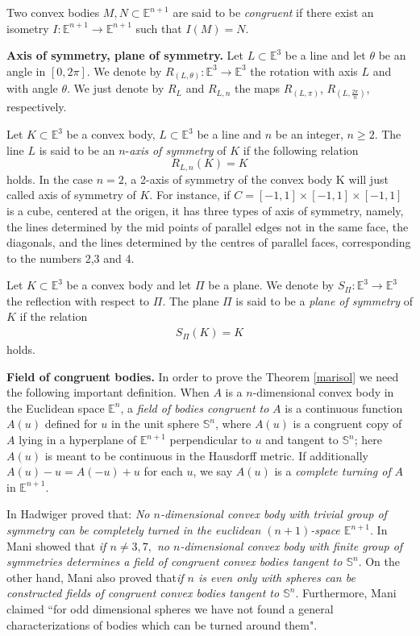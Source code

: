 \documentclass[12pt]{amsart}
\begin{document}
Two convex bodies $M,N\subset \mathbb{E}^{n+1}$ are said to be \textit{congruent} if there exist an isometry $I:\mathbb{E}^{n+1} \rightarrow \mathbb{E}^{n+1}$ such that $I(M)=N$.

\textbf{Axis of symmetry, plane of symmetry.}
Let $L\subset \mathbb{E}^3$ be a line and let $\theta$ be an angle in 
$[0, 2\pi]$. We denote by 
$R_{(L,\theta)}:\mathbb{E}^3 \rightarrow \mathbb{E}^3$ the rotation with axis $L$ and with angle $\theta$. We just denote by $R_L$ and $R_{L,n}$ the maps $R_{(L,\pi)}$, $R_{(L, \frac{2\pi}{n})}$, respectively.

Let $K \subset \mathbb{E}^3$ be a convex body, $L\subset \mathbb{E}^3$ be a line and $n$ be an integer, $n \geq 2$.
The line $L$ is said to be an $n$-\textit{axis of symmetry} of $K$ if the following relation
\[
R_{L,n}(K) = K
\]
holds. In the case $n = 2$, a 2-axis of symmetry of the convex body K will just called axis of symmetry of $K$. For instance, if $C = [-1, 1] \times [-1, 1] \times [-1, 1]$ is a cube, centered at the origen, it has three types of axis of symmetry, namely,  the lines determined by the mid points of parallel edges not in the same face, the diagonals, and the lines determined by the centres of parallel faces, corresponding to the numbers 2,3 and 4.

Let $K \subset \mathbb{E}^3$ be a convex body and let
$\Pi$ be a plane. We denote by $S_{\Pi} :  \mathbb{E}^3 \rightarrow \mathbb{E}^3$ the reflection with respect
to $\Pi$. The plane $\Pi$ is said to be a \textit{plane of symmetry} of $K$ if the relation
\begin{eqnarray}\label{mami}
S_{\Pi} (K) = K
\end{eqnarray}
holds. 
  
\textbf{Field of congruent bodies.}
In order to prove the Theorem \ref{marisol} we need the following important definition. When $A$ is a $n$-dimensional convex body in the Euclidean space $\mathbb{E}^{n}$, a \textit{field of bodies congruent to} $A$ is a continuous function $A(u)$ defined for $u$ in the unit sphere $\mathbb{S}^n$, where $A(u)$ is a congruent copy of $A$ lying in a hyperplane of $\mathbb{E}^{n+1}$ perpendicular to $u$ and tangent to $\mathbb{S}^n$; here $A(u)$ is meant to be continuous in the Hausdorff metric. If additionally $A(u)-u= A(-u)+u$ for each $u$, we say $A(u)$ is a \textit{complete turning of} $A$ in $\mathbb{E}^{n+1}$. 

In \cite{had} Hadwiger proved that: \textit{No $n$-dimensional convex body with trivial group of symmetry}  \textit{can be completely turned in the euclidean $(n+1)$-space $\mathbb{E}^{n+1}$}. In \cite{mani} Mani showed that \textit{if $n\not=3,7,$ no $n$-dimensional convex body with finite group of symmetries determines a field of congruent convex bodies tangent to $\mathbb{S}^n$}. On the other hand, Mani also proved  that\textit{if $n$ is even only with spheres can be constructed fields of congruent convex bodies tangent to $\mathbb{S}^n$}. Furthermore, Mani claimed ``for odd dimensional spheres we have not found a general characterizations of bodies which can be turned around them". 
\end{document}
